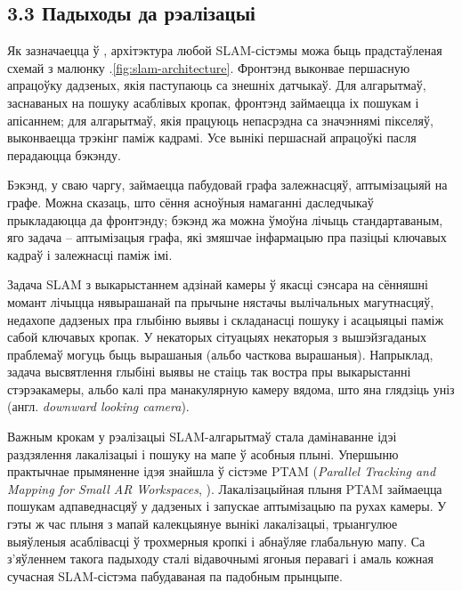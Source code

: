 \renewcommand{\nextTitle}{3.3 Падыходы да рэалізацыі}
\addcontentsline{toc}{subsection}{\nextTitle}
\subsection*{\nextTitle}

\vspace{5mm}

Як зазначаецца ў \cite{Li2016RealtimeSL}, архітэктура любой SLAM-сістэмы
можа быць прадстаўленая схемай з малюнку \cursection.\ref{fig:slam-architecture}. Фронтэнд выконвае
першасную апрацоўку дадзеных, якія паступаюць са знешніх датчыкаў. Для алгарытмаў,
заснаваных на пошуку асаблівых кропак, фронтэнд займаецца іх пошукам і апісаннем;
для алгарытмаў, якія працуюць непасрэдна са значэннямі пікселяў, выконваецца трэкінг паміж
кадрамі. Усе вынікі першаснай апрацоўкі пасля перадаюцца бэкэнду.

Бэкэнд, у сваю чаргу, займаецца пабудовай графа залежнасцяў, аптымізацыяй на графе.
Можна сказаць, што сёння асноўныя намаганні даследчыкаў прыкладаюцца да фронтэнду; бэкэнд
жа можна ўмоўна лічыць стандартаваным, яго задача -- аптымізацыя графа, які змяшчае інфармацыю
пра пазіцыі ключавых кадраў і залежнасці паміж імі.

Задача SLAM з выкарыстаннем адзінай камеры ў якасці сэнсара на сённяшні момант
лічыцца нявырашанай па прычыне нястачы вылічальных магутнасцяў, недахопе дадзеных
пра глыбіню выявы і складанасці пошуку і асацыяцыі паміж сабой ключавых кропак.
У некаторых сітуацыях некаторыя з вышэйзгаданых праблемаў могуць быць вырашаныя
(альбо часткова вырашаныя). Напрыклад, задача высвятлення глыбіні выявы не стаіць так
востра пры выкарыстанні стэрэакамеры, альбо калі пра манакулярную камеру вядома,
што яна глядзіць уніз (англ. \textit{downward looking camera}).

Важным крокам у рэалізацыі SLAM-алгарытмаў стала дамінаванне ідэі раздзялення лакалізацыі
і пошуку на мапе ў асобныя плыні. Упершыню практычнае прымяненне ідэя знайшла
ў сістэме PTAM (\textit{Parallel Tracking and Mapping for Small AR Workspaces}, \cite{Klein:2007:PTM:1514339.1514363}).
Лакалізацыйная плыня PTAM займаецца пошукам адпаведнасцяў у дадзеных і запускае
аптымізацыю па рухах камеры. У гэты ж час плыня з мапай калекцыянуе вынікі лакалізацыі,
трыангулюе выяўленыя асаблівасці ў трохмерныя кропкі і абнаўляе глабальную мапу.
Са з'яўленнем такога падыходу сталі відавочнымі ягоныя перавагі і амаль кожная
сучасная SLAM-сістэма пабудаваная па падобным прынцыпе.

